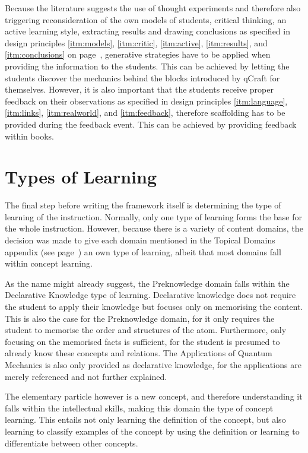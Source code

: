 \documentclass[11pt,twoside]{report} %
\begin{document}
Because the literature suggests the use of thought experiments and therefore also triggering reconsideration of the own models of students, critical thinking, an active learning style, extracting results and drawing conclusions as specified in design principles \ref{itm:models}, \ref{itm:critic}, \ref{itm:active}, \ref{itm:results}, and \ref{itm:conclusions} on page~\pageref{itm:models}, generative strategies have to be applied when providing the information to the students. This can be achieved by letting the students discover the mechanics behind the blocks introduced by qCraft for themselves. However, it is also important that the students receive proper feedback on their observations as specified in design principles \ref{itm:language}, \ref{itm:links}, \ref{itm:realworld}, and \ref{itm:feedback}, therefore scaffolding has to be provided during the feedback event. This can be achieved by providing feedback within books.

\section{Types of Learning}

The final step before writing the framework itself is determining the type of learning of the instruction. Normally, only one type of learning forms the base for the whole instruction. However, because there is a variety of content domains, the decision was made to give each domain mentioned in the Topical Domains appendix (see page~\pageref{app:topicaldomains}) an own type of learning, albeit that most domains fall within concept learning.

As the name might already suggest, the Preknowledge domain falls within the Declarative Knowledge type of learning. Declarative knowledge does not require the student to apply their knowledge but focuses only on memorising the content. This is also the case for the Preknowledge domain, for it only requires the student to memorise the order and structures of the atom. Furthermore, only focusing on the memorised facts is sufficient, for the student is presumed to already know these concepts and relations. The Applications of Quantum Mechanics is also only provided as declarative knowledge, for the applications are merely referenced and not further explained.

The elementary particle however is a new concept, and therefore understanding it falls within the intellectual skills, making this domain the type of concept learning. This entails not only learning the definition of the concept, but also learning to classify examples of the concept by using the definition or learning to differentiate between other concepts.
\end{document}
